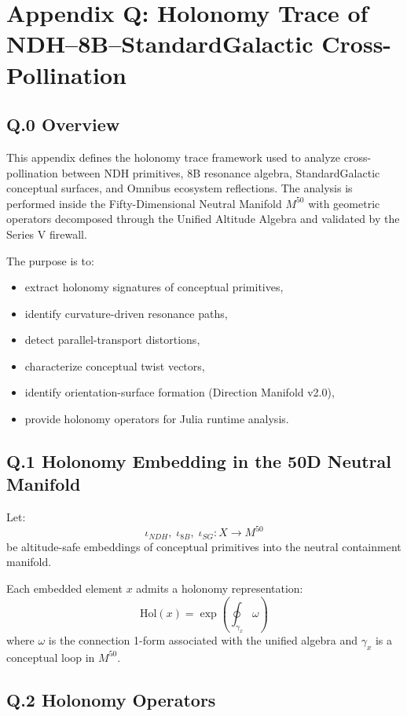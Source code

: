 \appendix
\section*{Appendix Q: Holonomy Trace of NDH–8B–StandardGalactic Cross-Pollination}

\subsection*{Q.0 Overview}

This appendix defines the holonomy trace framework used to analyze
cross-pollination between NDH primitives, 8B resonance algebra,
StandardGalactic conceptual surfaces, and Omnibus ecosystem reflections.
The analysis is performed inside the Fifty-Dimensional Neutral Manifold
$M^{50}$ with geometric operators decomposed through the Unified Altitude
Algebra and validated by the Series V firewall.

The purpose is to:
\begin{itemize}
    \item extract holonomy signatures of conceptual primitives,
    \item identify curvature-driven resonance paths,
    \item detect parallel-transport distortions,
    \item characterize conceptual twist vectors,
    \item identify orientation-surface formation (Direction Manifold v2.0),
    \item provide holonomy operators for Julia runtime analysis.
\end{itemize}

\subsection*{Q.1 Holonomy Embedding in the 50D Neutral Manifold}

Let:
\[
\iota_{NDH},\; \iota_{8B},\; \iota_{SG} : X \to M^{50}
\]
be altitude-safe embeddings of conceptual primitives into the neutral
containment manifold.

Each embedded element $x$ admits a holonomy representation:
\[
\mathrm{Hol}(x) = \exp\left(\oint_{\gamma_x} \omega\right)
\]
where $\omega$ is the connection 1-form associated with the unified
algebra and $\gamma_x$ is a conceptual loop in $M^{50}$.

\subsection*{Q.2 Holonomy Operators}

